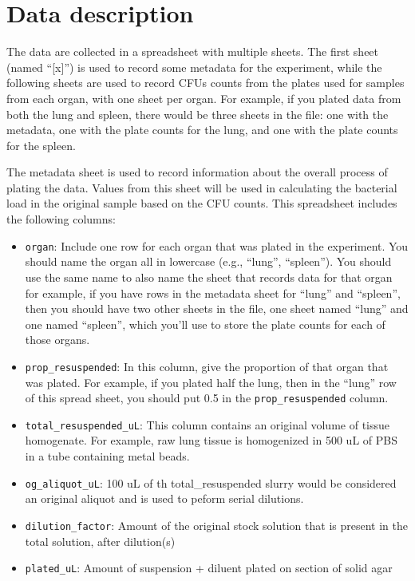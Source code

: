 \documentclass[
]{book}
\providecommand{\tightlist}{%
  \setlength{\itemsep}{0pt}\setlength{\parskip}{0pt}}
\begin{document}
\hypertarget{data-description}{%
\section{Data description}\label{data-description}}

The data are collected in a spreadsheet with multiple sheets. The first sheet
(named ``{[}x{]}'') is used to record some metadata for the experiment, while the
following sheets are used to record CFUs counts from the plates used for samples
from each organ, with one sheet per organ. For example, if you plated data
from both the lung and spleen, there would be three sheets in the file: one
with the metadata, one with the plate counts for the lung, and one with the
plate counts for the spleen.

The metadata sheet is used to record information about the overall process of
plating the data. Values from this sheet will be used in calculating the bacterial
load in the original sample based on the CFU counts. This spreadsheet includes
the following columns:

\begin{itemize}
\tightlist
\item
  \texttt{organ}: Include one row for each organ that was plated in the experiment.
  You should name the organ all in lowercase (e.g., ``lung'', ``spleen''). You
  should use the same name to also name the sheet that records data for that organ
  for example, if you have rows in the metadata sheet for ``lung'' and ``spleen'',
  then you should have two other sheets in the file, one sheet named ``lung'' and
  one named ``spleen'', which you'll use to store the plate counts for each of those
  organs.
\item
  \texttt{prop\_resuspended}: In this column, give the proportion of that organ that
  was plated. For example, if you plated half the lung, then in the ``lung'' row
  of this spread sheet, you should put 0.5 in the \texttt{prop\_resuspended} column.
\item
  \texttt{total\_resuspended\_uL}: This column contains an original volume of tissue homogenate. For example, raw lung tissue is homogenized in 500 uL of PBS in a tube containing metal beads.
\item
  \texttt{og\_aliquot\_uL}: 100 uL of th total\_resuspended slurry would be considered an original aliquot and is used to peform serial dilutions.
\item
  \texttt{dilution\_factor}: Amount of the original stock solution that is present in the total solution, after dilution(s)
\item
  \texttt{plated\_uL}: Amount of suspension + diluent plated on section of solid agar
\end{itemize}
\end{document}
